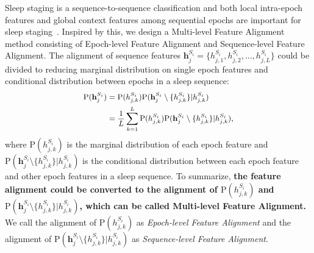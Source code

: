 \documentclass[letterpaper]{article} %
\begin{document}
	Sleep staging is a sequence-to-sequence classification and both local intra-epoch features and global context features among sequential epochs are important for sleep staging~\citep{Eldele2021AnAD, Phan2021XSleepNetMS}. Inspired by this, we design a Multi-level Feature Alignment method consisting of Epoch-level Feature Alignment and Sequence-level Feature Alignment.
	The alignment of sequence features $\mathrm{\mathbf{h}}^{S_i}_j = \{h^{S_i}_{j, 1}, h^{S_i}_{j, 2}, ... , h^{S_i}_{j, L}\}$ could be divided to reducing marginal distribution on single epoch features and conditional distribution between epochs in a sleep sequence:%
	\begin{equation}
		\label{diveded}
		\small
		\begin{split}
			\mathrm{P}(\mathrm{\mathbf{h}}^{S_i}_j)&=\mathrm{P}(h^{S_i}_{j, k})\mathrm{P}(\mathrm{\mathbf{h}}^{S_i}_j \setminus \{h^{S_i}_{j, k}\}|h^{S_i}_{j, k})\\
			&= \frac{1}{L}\sum^{L}_{k=1}\mathrm{P}(h^{S_i}_{j, k})\mathrm{P}(\mathrm{\mathbf{h}}^{S_i}_j \setminus \{h^{S_i}_{j, k}\}|h^{S_i}_{j, k}),
		\end{split}
	\end{equation}
	where $\mathrm{P}(h^{S_i}_{j, k})$ is the marginal distribution of each epoch feature and $\mathrm{P}(\mathrm{\mathbf{h}}^{S_i}_j\setminus \{h^{S_i}_{j, k}\}|h^{S_i}_{j, k})$ is the conditional distribution between each epoch feature and other epoch features in a sleep sequence.
	To summarize, \textbf{the feature alignment could be converted to the alignment of $\mathrm{P}(h^{S_i}_{j, k})$ and $\mathrm{P}(\mathrm{\mathbf{h}}^{S_i}_j\setminus \{h^{S_i}_{j, k}\}|h^{S_i}_{j, k})$, which can be called Multi-level Feature Alignment.}
	We call the alignment of $\mathrm{P}(h^{S_i}_{j, k})$ as \textit{Epoch-level Feature Alignment} and the alignment of  $\mathrm{P}(\mathrm{\mathbf{h}}^{S_i}_j\setminus \{h^{S_i}_{j, k}\}|h^{S_i}_{j, k})$ as \textit{Sequence-level Feature Alignment}.
	
\end{document}

